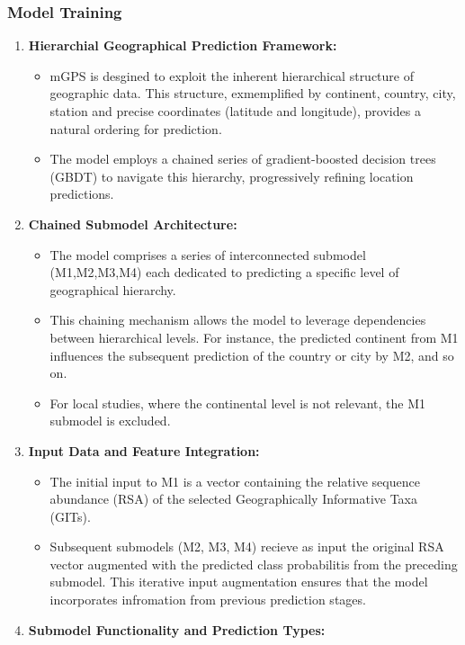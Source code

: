 \subsubsection{Model Training}
\begin{enumerate}
    \item \textbf{Hierarchial Geographical Prediction Framework:}
    \begin{itemize}
        \item mGPS is desgined to exploit the inherent hierarchical structure of geographic data. This structure, exmemplified by continent, country, city, station
    and precise coordinates (latitude and longitude), provides a natural ordering for prediction.
        \item The model employs a chained series of gradient-boosted decision trees (GBDT) to navigate this hierarchy, progressively refining location predictions.       
    \end{itemize}
    \item \textbf{Chained Submodel Architecture:}
    \begin{itemize}
        \item The model comprises a series of interconnected submodel (M1,M2,M3,M4) each dedicated to predicting a specific level of geographical hierarchy.
        \item  This chaining mechanism allows the model to leverage dependencies between hierarchical levels. For instance, the predicted continent from M1 influences the subsequent
        prediction of the country or city by M2, and so on.
        \item For local studies, where the continental level is not relevant, the M1 submodel is excluded.
    \end{itemize}
    \item \textbf{Input Data and Feature Integration:}
    \begin{itemize}
        \item The initial input to M1 is a vector containing the relative sequence abundance (RSA) of the selected Geographically Informative Taxa (GITs).
        \item Subsequent submodels (M2, M3, M4) recieve as input the original RSA vector augmented with the predicted class probabilitis from the preceding submodel. This iterative input augmentation ensures that the model incorporates infromation from previous prediction stages.
    \end{itemize}
    \item \textbf{Submodel Functionality and Prediction Types:}

\end{enumerate}
